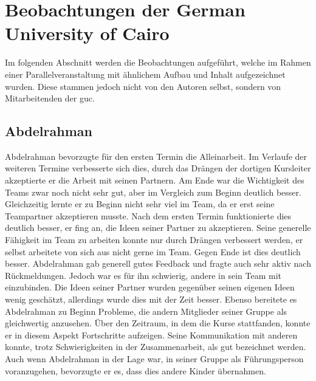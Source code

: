 \section{Beobachtungen der German University of Cairo}
Im folgenden Abschnitt werden die Beobachtungen aufgeführt, welche im Rahmen einer Parallelveranstaltung mit ähnlichem Aufbau und Inhalt aufgezeichnet wurden. Diese stammen jedoch nicht von den Autoren selbst, sondern von Mitarbeitenden der \acrlong{guc}.\\

\subsection{Abdelrahman}
Abdelrahman bevorzugte für den ersten Termin die Alleinarbeit. Im Verlaufe der weiteren Termine verbesserte sich dies, durch das Drängen der dortigen Kursleiter akzeptierte er die Arbeit mit seinen Partnern. Am Ende war die Wichtigkeit des Teams zwar noch nicht sehr gut, aber im Vergleich zum Beginn deutlich besser. Gleichzeitig lernte er zu Beginn nicht sehr viel im Team, da er erst seine Teampartner akzeptieren musste. Nach dem ersten Termin funktionierte dies deutlich besser, er fing an, die Ideen seiner Partner zu akzeptieren. Seine generelle Fähigkeit im Team zu arbeiten konnte nur durch Drängen verbessert werden, er selbst arbeitete von sich aus nicht gerne im Team. Gegen Ende ist dies deutlich besser. Abdelrahman gab generell gutes Feedback und fragte auch sehr aktiv nach Rückmeldungen. Jedoch war es für ihn schwierig, andere in sein Team mit einzubinden. Die Ideen seiner Partner wurden gegenüber seinen eigenen Ideen wenig geschätzt, allerdings wurde dies mit der Zeit besser. Ebenso bereitete es Abdelrahman zu Beginn Probleme, die andern Mitglieder seiner Gruppe als gleichwertig anzusehen. Über den Zeitraum, in dem die Kurse stattfanden, konnte er in diesem Aspekt Fortschritte aufzeigen. Seine Kommunikation mit anderen konnte, trotz Schwierigkeiten in der Zusammenarbeit, als gut bezeichnet werden. Auch wenn Abdelrahman in der Lage war, in seiner Gruppe als Führungsperson voranzugehen, bevorzugte er es, dass dies andere Kinder übernahmen.\\

